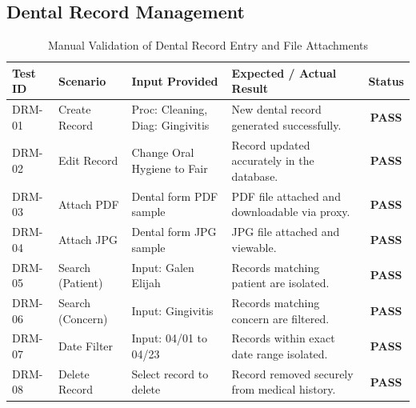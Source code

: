 \subsection{Dental Record Management}
\begin{table}[H]
\centering
\caption{Manual Validation of Dental Record Entry and File Attachments}
\begin{tabularx}{\textwidth}{|l|Y|Y|Y|c|}
\hline
\textbf{Test ID} & \textbf{Scenario} & \textbf{Input Provided} & \textbf{Expected / Actual Result} & \textbf{Status} \\
\hline
DRM-01 & Create Record & Proc: Cleaning, Diag: Gingivitis & New dental record generated successfully. & \textbf{PASS} \\
\hline
DRM-02 & Edit Record & Change Oral Hygiene to Fair & Record updated accurately in the database. & \textbf{PASS} \\
\hline
DRM-03 & Attach PDF & Dental form PDF sample & PDF file attached and downloadable via proxy. & \textbf{PASS} \\
\hline
DRM-04 & Attach JPG & Dental form JPG sample & JPG file attached and viewable. & \textbf{PASS} \\
\hline
DRM-05 & Search (Patient) & Input: Galen Elijah & Records matching patient are isolated. & \textbf{PASS} \\
\hline
DRM-06 & Search (Concern) & Input: Gingivitis & Records matching concern are filtered. & \textbf{PASS} \\
\hline
DRM-07 & Date Filter & Input: 04/01 to 04/23 & Records within exact date range isolated. & \textbf{PASS} \\
\hline
DRM-08 & Delete Record & Select record to delete & Record removed securely from medical history. & \textbf{PASS} \\
\hline
\end{tabularx}
\end{table}

